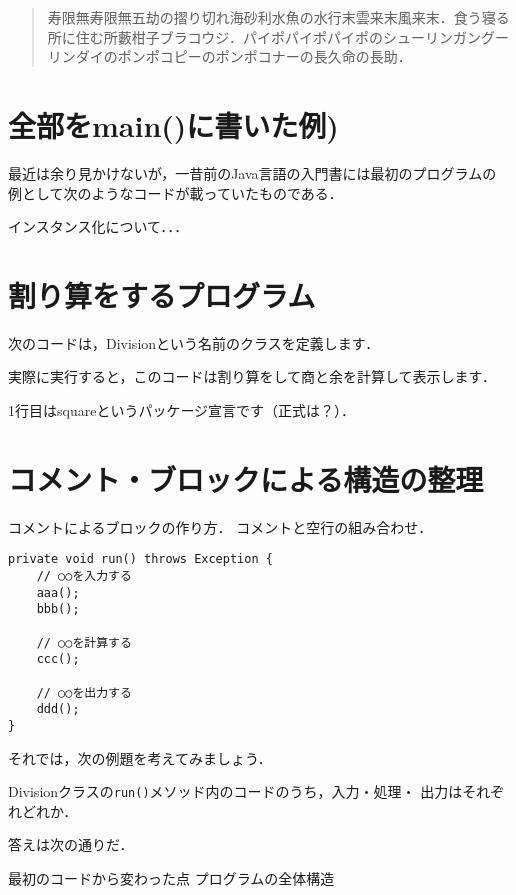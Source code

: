 \documentclass[a4j,papersize]{jsbook}
\begin{document}
\begin{abstract}
寿限無寿限無五劫の摺り切れ海砂利水魚の水行末雲来末風来末．食う寝る所に住む所藪柑子ブラコウジ．パイポパイポパイポのシューリンガングーリンダイのポンポコピーのポンポコナーの長久命の長助．
\end{abstract}

\section{全部をmain()に書いた例)}
最近は余り見かけないが，一昔前のJava言語の入門書には最初のプログラムの
例として次のようなコードが載っていたものである．



インスタンス化について．．．

\section{割り算をするプログラム}

次のコードは，Divisionという名前のクラスを定義します．

実際に実行すると，このコードは割り算をして商と余を計算して表示します．


1行目はsquareというパッケージ宣言です（正式は？）．

\section{コメント・ブロックによる構造の整理}
コメントによるブロックの作り方．
コメントと空行の組み合わせ．

\begin{verbatim}
private void run() throws Exception {
    // ○○を入力する
    aaa();
    bbb();

    // ○○を計算する
    ccc();

    // ○○を出力する
    ddd();
}
\end{verbatim}

それでは，次の例題を考えてみましょう．

\begin{例題}
 Divisionクラスの\texttt{run()}メソッド内のコードのうち，入力・処理・
 出力はそれぞれどれか．
\end{例題}

答えは次の通りだ．


最初のコードから変わった点
プログラムの全体構造
\end{document}
